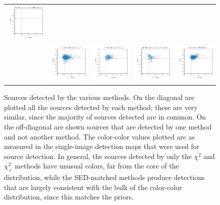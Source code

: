 \documentclass[11pt,letterpaper,linenumbers]{aastex63}
\newcommand{\chipos}{\chi_+}
\begin{document}
\begin{figure}[p!]
\begin{center}
\begin{tabular}{c@{}c@{}c@{}c@{}c}
      \includegraphics[height=0.24\textwidth]{unmatched-sed-union-sed-mix-7} \\
      \raisebox{0.05\textwidth}{\rotatebox[origin=l]{90}{SED (Bayes)}} &
      \includegraphics[height=0.24\textwidth]{unmatched-sed-mix-chisq-7} &
      \includegraphics[height=0.24\textwidth]{unmatched-sed-mix-chipos-7} &
      \includegraphics[height=0.24\textwidth]{unmatched-sed-mix-sed-union-7} &
      \includegraphics[height=0.24\textwidth]{colorcolor-sed-mix}
    \end{tabular}
  \end{center}
  \caption{Sources detected by the various methods.  On the diagonal are plotted
    all the sources detected by each method; these are very similar, since the
    majority of sources detected are in common.  On the off-diagonal are shown
    sources that are detected by one method and not another method.
    The color-color values plotted are as measured in the single-image detection
    maps that were used for source detection.
    In general, the sources detected by only the $\chi^2$ and $\chipos^2$ methods
    have unusual colors, far from the core of the distribution, while the
    SED-matched methods produce detections that are largely consistent with the
    bulk of the color-color distribution, since this matches the priors.
    \label{fig:comp-cc}}
\end{figure}
\end{document}
